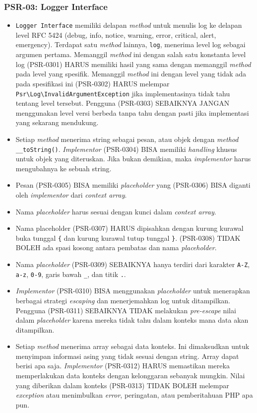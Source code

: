 \subsubsection{PSR-03: Logger Interface}
\label{subsubsec:psr03}
\begin{itemize}
	\item \verb|Logger Interface| memiliki delapan \textit{method} untuk menulis log ke delapan level RFC 5424 (debug, info, notice, warning, error, critical, alert, emergency). Terdapat satu \textit{method} lainnya, \verb|log|, menerima level log sebagai argumen pertama. Memanggil \textit{method} ini dengan salah satu konstanta level log (PSR-0301) HARUS memiliki hasil yang sama dengan memanggil \textit{method} pada level yang spesifik. Memanggil \textit{method} ini dengan level yang tidak ada pada spesifikasi ini (PSR-0302) HARUS melempar \verb|Psr\Log\InvalidArgumentException| jika implementasinya tidak tahu tentang level tersebut. Pengguna (PSR-0303) SEBAIKNYA JANGAN menggunakan level versi berbeda tanpa tahu dengan pasti jika implementasi yang sekarang mendukung. 
	\item Setiap \textit{method} menerima string sebagai pesan, atau objek dengan \textit{method} \verb|__toString()|. \textit{Implementor} (PSR-0304) BISA memiliki \textit{handling} khusus untuk objek yang diteruskan. Jika bukan demikian, maka \textit{implementor} harus mengubahnya ke sebuah string.
	\item Pesan (PSR-0305) BISA memiliki \textit{placeholder} yang (PSR-0306) BISA diganti oleh \textit{implementor} dari \textit{context array}.
	\item Nama \textit{placeholder} harus sesuai dengan kunci dalam \textit{context array}.
	\item Nama placeholder (PSR-0307) HARUS dipisahkan dengan kurung kurawal buka tunggal \verb|{| dan kurung kurawal tutup tunggal \verb|}|. (PSR-0308) TIDAK BOLEH ada spasi kosong antara pembatas dan nama \textit{placeholder}.
	\item Nama \textit{placeholder} (PSR-0309) SEBAIKNYA hanya terdiri dari karakter \verb|A-Z|, \verb|a-z|, \verb|0-9|, garis bawah \verb|_|, dan titik \verb|.|.
	\item \textit{Implementor} (PSR-0310) BISA menggunakan \textit{placeholder} untuk menerapkan berbagai strategi \textit{escaping} dan menerjemahkan log untuk ditampilkan. Pengguna (PSR-0311) SEBAIKNYA TIDAK melakukan \textit{pre-escape} nilai dalam \textit{placeholder} karena mereka tidak tahu dalam konteks mana data akan ditampilkan. 
	\item Setiap \textit{method} menerima array sebagai data konteks. Ini dimaksudkan untuk menyimpan informasi asing yang tidak sesuai dengan string. Array dapat berisi apa saja. \textit{Implementor} (PSR-0312) HARUS memastikan mereka memperlakukan data konteks dengan kelonggaran sebanyak mungkin. Nilai yang diberikan dalam konteks (PSR-0313) TIDAK BOLEH melempar \textit{exception} atau menimbulkan \textit{error}, peringatan, atau pemberitahuan PHP apa pun.

\end{itemize}
